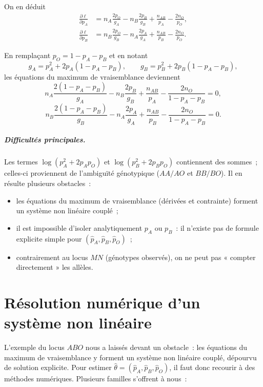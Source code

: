 \begin{exemple}
On en déduit
\begin{align*}
\frac{\partial \ell}{\partial p_A}
  &= n_A \frac{2 p_O}{g_A} - n_B \frac{2 p_B}{g_B}
     + \frac{n_{AB}}{p_A} - \frac{2 n_O}{p_O}, \\
\frac{\partial \ell}{\partial p_B}
  &= n_B \frac{2 p_O}{g_B} - n_A \frac{2 p_A}{g_A}
     + \frac{n_{AB}}{p_B} - \frac{2 n_O}{p_O} .
\end{align*}

En remplaçant $p_O = 1 - p_A - p_B$ et en notant
$$
g_A = p_A^2 + 2 p_A (1 - p_A - p_B), \qquad
g_B = p_B^2 + 2 p_B (1 - p_A - p_B),
$$
les équations du maximum de vraisemblance deviennent
$$
n_A \frac{2(1 - p_A - p_B)}{g_A} - n_B \frac{2 p_B}{g_B}
+ \frac{n_{AB}}{p_A} - \frac{2 n_O}{1 - p_A - p_B} = 0,
$$
$$
n_B \frac{2(1 - p_A - p_B)}{g_B} - n_A \frac{2 p_A}{g_A}
+ \frac{n_{AB}}{p_B} - \frac{2 n_O}{1 - p_A - p_B} = 0 .
$$

\paragraph{Difficultés principales.}
Les termes $\log(p_A^2 + 2 p_A p_O)$ et $\log(p_B^2 + 2 p_B p_O)$ contiennent des
sommes~; celles-ci proviennent de l'ambiguïté génotypique ($AA/AO$ et $BB/BO$).
Il en résulte plusieurs obstacles~:
\begin{itemize}
  \item les équations du maximum de vraisemblance (dérivées et contrainte)
        forment un système non linéaire couplé~;
  \item il est impossible d'isoler analytiquement $p_A$ ou $p_B$~: il n'existe
        pas de formule explicite simple pour
        $(\hat{p}_A, \hat{p}_B, \hat{p}_O)$~;
  \item contrairement au locus $MN$ (génotypes observés), on ne peut pas
        « compter directement » les allèles.
\end{itemize}
\end{exemple}

\chapter{Résolution numérique d'un système non linéaire}

L'exemple du locus $ABO$ nous a laissés devant un obstacle~: les équations du
maximum de vraisemblance y forment un système non linéaire couplé, dépourvu de
solution explicite. Pour estimer $\hat{\theta} = (\hat{p}_A, \hat{p}_B,
\hat{p}_O)$, il faut donc recourir à des méthodes numériques. Plusieurs familles
s'offrent à nous~:

